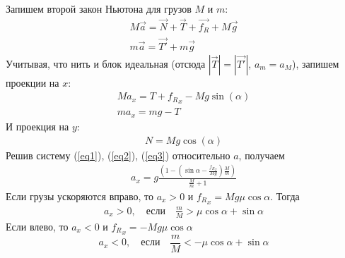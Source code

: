 \documentclass[a5paper,10pt]{article}\usepackage[usenames,dvipsnames]{color}\usepackage{extsizes,cmap,graphicx,misccorr,indentfirst,makecell,multirow,ulem,geometry,amssymb,amsfonts,amsmath,amsthm,titlesec,float,fancyhdr,wrapfig,tikz}\usepackage[T2A]{fontenc}\usepackage[utf8x]{inputenc}\usepackage[english, russian]{babel}\usetikzlibrary{decorations.pathreplacing,decorations.pathmorphing,patterns,calc,scopes,arrows,through}\graphicspath{{img/}}\linespread{1.3}\frenchspacing\geometry{left=1cm, right=1cm, top=2cm, bottom=1cm, bindingoffset=0cm}\pagestyle{fancy}\fancyhead{}\fancyhead[R]{Сарафанов Ф.Г.}
\begin{document}
\def\N{\vec{N}}
\def\T{\vec{T}}
\def\t{\vec{T'}}
\def\F{\vec{f_R}}
\def\P{M\vec{g}}
\def\p{m\vec{g}}

Запишем второй закон Ньютона для грузов $M$ и $m$: 
\begin{gather}
	M\vec{a}=\N+\T+\F+\P\\
	m\vec{a}=\t+\p
\end{gather}
Учитывая, что нить и блок идеальная  (отсюда $|\T|=|\t|$, $a_m=a_M$), запишем проекции на $x$: 
\begin{gather}
	\label{eq1}Ma_x=T+{f_R}_x-Mg\sin(\alpha)\\
	\label{eq2}ma_x=mg-T
\end{gather}
И проекция на $y$:
\begin{gather}
	\label{eq3}N=Mg\cos(\alpha)
\end{gather}
Решив систему (\ref{eq1}), (\ref{eq2}), (\ref{eq3}) относительно $a$, получаем
\begin{gather}
	\label{eq4}
    a_x=g\frac{(1-(\sin{\alpha}-\frac{{f_R}_x}{Mg})\frac{M}{m})}{\frac{M}{m}+1}
\end{gather}
Если грузы ускоряются вправо, то $a_x>0$ и ${f_R}_x=Mg\mu\cos\alpha$. Тогда
\begin{gather}
	a_x>0, \hspace{1em}\text{если}\hspace{1em} \frac{m}{M}>\mu\cos{\alpha}+\sin{\alpha}
\end{gather}
Если влево, то $a_x<0$ и ${f_R}_x=-Mg\mu\cos\alpha$
\begin{equation}
        a_x<0, \hspace{1em}\text{если}\hspace{1em} \frac{m}{M}<-\mu\cos{\alpha}+\sin{\alpha}
\end{equation}
\end{document}
